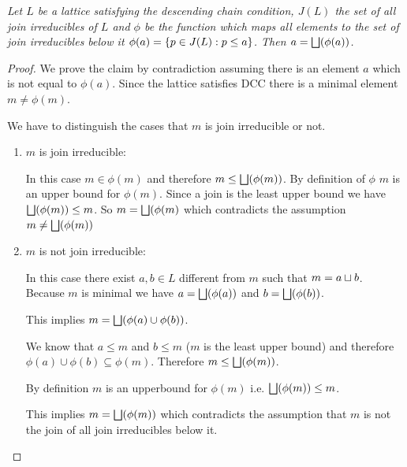 \begin{theorem}
    \label{thmJoinOfJoinIrreduciblesBelow}
    \emph{ Let $L$ be a lattice satisfying the descending chain condition,
    $J(L)$ the set of all join irreducibles of $L$ and $\phi$ be the function
    which maps all elements to the set of join irreducibles below it $\phi(a) =
    \left\{p \in J(L): p \le a\right\}$. Then $a = \bigsqcup(\phi(a))$.}

    \begin{proof}
        We prove the claim by contradiction assuming there is an element $a$
        which is not equal to $\phi(a)$. Since the lattice satisfies DCC there
        is a minimal element $m \ne \phi(m)$.

        We have to distinguish the cases that $m$ is join irreducible or not.

        \begin{enumerate}
            \item $m$ is join irreducible:

                In this case $m \in \phi(m)$ and therefore $m \le
                \bigsqcup(\phi(m))$. By definition of $\phi$ $m$ is an upper
                bound for $\phi(m)$. Since a join is the least upper bound we
                have $\bigsqcup(\phi(m)) \le m$. So $m = \bigsqcup(\phi(m)$ which
                contradicts the assumption $m \ne \bigsqcup(\phi(m))$


            \item $m$ is not join irreducible:

                In this case there exist $a,b \in L$ different from $m$ such
                that $m = a \sqcup b$.  Because $m$ is minimal we have $a =
                \bigsqcup(\phi(a))$ and $b = \bigsqcup(\phi(b))$.

                This implies $m = \bigsqcup(\phi(a) \cup \phi(b))$.

                We know that $a \le m$ and $b \le m$ ($m$ is the least upper
                bound) and therefore $\phi(a) \cup \phi(b) \subseteq \phi(m)$.
                Therefore $m \le \bigsqcup(\phi(m))$.

                By definition $m$ is an upperbound for $\phi(m)$ i.e.
                $\bigsqcup(\phi(m)) \le m$.

                This implies $m = \bigsqcup(\phi(m))$ which contradicts the
                assumption that $m$ is not the join of all join irreducibles
                below it.
        \end{enumerate}
    \end{proof}
\end{theorem}







